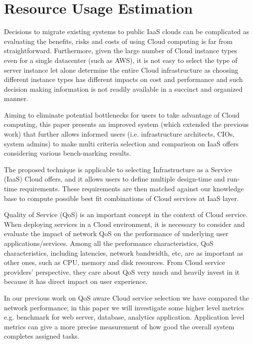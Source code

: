 \chapter{Resource Usage Estimation}
\label{cha:ResourceUsageEstimation}
Decisions to migrate existing systems to public IaaS clouds can be complicated as evaluating the benefits, risks and costs of using Cloud computing is far from straightforward. Furthermore, given the large number of Cloud instance types even for a single datacenter (such as AWS), it is not easy to select the type of server instance let alone determine the entire Cloud infrastructure as choosing different instance types has different impacts on cost and performance and such decision making information is not readily available in a succinct and organized manner.

Aiming to eliminate potential bottlenecks for users to take advantage of Cloud computing, this paper presents an improved system (which extended the previous work) that further allows informed users (i.e. infrastructure architects, CIOs, system admins) to make multi criteria selection and comparison on IaaS offers considering various bench-marking results. 

The proposed technique is applicable to selecting Infrastructure as a Service (IaaS) Cloud offers, and it allows users to define multiple design-time and run-time requirements. These requirements are then matched against our knowledge base to compute possible best fit combinations of Cloud services at IaaS layer. 

Quality of Service (QoS) is an important concept in the context of Cloud service. When deploying services in a Cloud environment, it is necessary to consider and evaluate the impact of network QoS on the performance of underlying user applications/services. Among all the performance characteristics, QoS characteristics, including latencies, network bandwidth, etc, are as important as other ones, such as CPU, memory and disk resources. From Cloud service providers’ perspective, they care about QoS very much and heavily invest in it because it has direct impact on user experience. 

In our previous work on QoS aware Cloud service selection we have compared the network performance; in this paper we will investigate some higher level metrics e.g. benchmark for web server, database, analytics application. Application level metrics can give a more precise measurement of how good the overall system completes assigned tasks.

